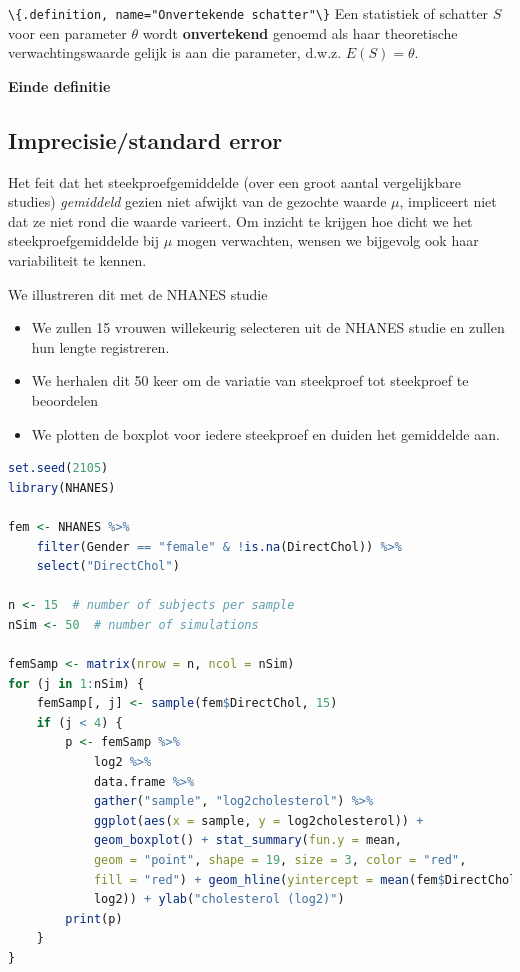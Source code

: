 \documentclass[
  12pt,dutch,coursenotes]{book}
\newcommand{\passthrough}[1]{#1}
\providecommand{\tightlist}{%
  \setlength{\itemsep}{0pt}\setlength{\parskip}{0pt}}
\begin{document}
\passthrough{\lstinline!\{.definition, name="Onvertekende schatter"\}!}
Een statistiek of schatter \(S\) voor een
parameter \(\theta\) wordt \textbf{onvertekend} genoemd als haar theoretische
verwachtingswaarde gelijk is aan die parameter, d.w.z. \(E(S)= \theta\).

\textbf{Einde definitie}

\hypertarget{imprecisiestandard-error}{%
\subsection{Imprecisie/standard error}\label{imprecisiestandard-error}}

Het feit dat het steekproefgemiddelde (over een groot aantal vergelijkbare studies) \emph{gemiddeld} gezien niet afwijkt van de gezochte waarde \(\mu\), impliceert niet dat ze niet rond die waarde varieert.
Om inzicht te krijgen hoe dicht we het steekproefgemiddelde bij \(\mu\) mogen verwachten, wensen we bijgevolg ook haar variabiliteit te kennen.

We illustreren dit met de NHANES studie

\begin{itemize}
\tightlist
\item
  We zullen 15 vrouwen willekeurig selecteren uit de NHANES studie en zullen hun lengte registreren.
\item
  We herhalen dit 50 keer om de variatie van steekproef tot steekproef te beoordelen
\item
  We plotten de boxplot voor iedere steekproef en duiden het gemiddelde aan.
\end{itemize}

\begin{lstlisting}[language=R]
set.seed(2105)
library(NHANES)

fem <- NHANES %>%
    filter(Gender == "female" & !is.na(DirectChol)) %>%
    select("DirectChol")

n <- 15  # number of subjects per sample
nSim <- 50  # number of simulations

femSamp <- matrix(nrow = n, ncol = nSim)
for (j in 1:nSim) {
    femSamp[, j] <- sample(fem$DirectChol, 15)
    if (j < 4) {
        p <- femSamp %>%
            log2 %>%
            data.frame %>%
            gather("sample", "log2cholesterol") %>%
            ggplot(aes(x = sample, y = log2cholesterol)) +
            geom_boxplot() + stat_summary(fun.y = mean,
            geom = "point", shape = 19, size = 3, color = "red",
            fill = "red") + geom_hline(yintercept = mean(fem$DirectChol %>%
            log2)) + ylab("cholesterol (log2)")
        print(p)
    }
}
\end{lstlisting}
\end{document}
